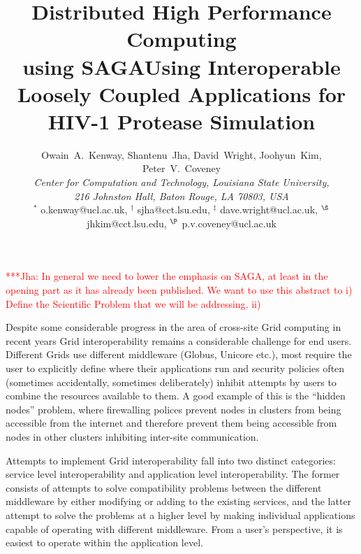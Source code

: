 \documentclass[a4paper,10pt,twocolumn]{article}
\newcommand{\jhanote}[1]{ {\textcolor{red} { ***Jha: #1 }}}
\newcommand{\jhanote}[1]{}
\begin{document}
\thispagestyle{plain}
\title{Distributed High Performance Computing \\ using SAGA}
\title{Using Interoperable Loosely Coupled Applications for HIV-1 Protease Simulation}
\author{Owain~A.~Kenway\footnotemark, Shantenu~Jha\footnotemark, David~Wright\footnotemark, Joohyun~Kim\footnotemark, Peter~V.~Coveney\footnotemark \\ {\em \small{Center for Computation and Technology, Louisiana State University,}} \\ {\em {\small 216 Johnston Hall, Baton Rouge, LA 70803, USA}}
\\ {\footnotesize $^*$ o.kenway@ucl.ac.uk, $^\dag$ sjha@cct.lsu.edu, $^\ddag$ dave.wright@ucl.ac.uk, $^\S$ jhkim@cct.lsu.edu, $^\P$ p.v.coveney@ucl.ac.uk}}

\date{}

\maketitle



\jhanote{In general we need to lower the emphasis on SAGA, at least in
the opening part as it has already been published. We want to use this
abstract to i) Define the Scientific Problem that we will be addressing, 
ii) }
 

Despite some considerable progress in the area of cross-site Grid computing in recent years\cite{ref:hpdc} Grid interoperability remains a considerable challenge for end users.  Different Grids use different middleware (Globus, Unicore etc.), most require the user to explicitly define where their applications run and security policies often (sometimes accidentally, sometimes deliberately) inhibit attempts by users to combine the resources available to them.  A good example of this is the ``hidden nodes'' problem, where firewalling polices prevent nodes in clusters from being accessible from the internet and therefore prevent them being accessible from nodes in other clusters inhibiting inter-site communication.

Attempts to implement Grid interoperability fall into two distinct categories: service level interoperability and application level interoperability.  The former consists of attempts to solve compatibility problems between the different middleware by either modifying or adding to the existing services, and the latter attempt to solve the problems at a higher level by making individual applications capable of operating with different middleware.  From a user's perspective, it is easiest to operate within the application level.
\end{document}
